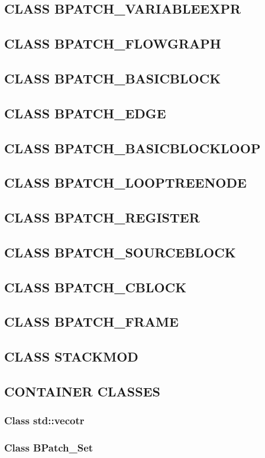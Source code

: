 \subsection{CLASS BPATCH\_VARIABLEEXPR}
\subsection{CLASS BPATCH\_FLOWGRAPH}
\subsection{CLASS BPATCH\_BASICBLOCK}
\subsection{CLASS BPATCH\_EDGE}
\subsection{CLASS BPATCH\_BASICBLOCKLOOP}
\subsection{CLASS BPATCH\_LOOPTREENODE}
\subsection{CLASS BPATCH\_REGISTER}
\subsection{CLASS BPATCH\_SOURCEBLOCK}
\subsection{CLASS BPATCH\_CBLOCK}\label{sec:bpatch_cblock}
\subsection{CLASS BPATCH\_FRAME}\label{sec:bpatch_frame}
\subsection{CLASS STACKMOD}
\subsection{CONTAINER CLASSES}
\subsubsection{Class std::vecotr}
\subsubsection{Class BPatch\_Set}
